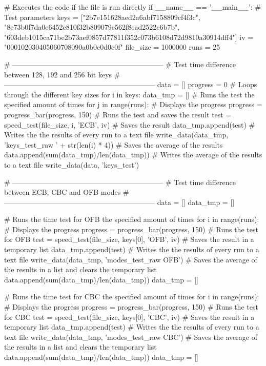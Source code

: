 \begin{python}
# Executes the code if the file is run directly
if __name__ == '__main__':
    # Test parameters
    keys = ["2b7e151628aed2a6abf7158809cf4f3c",
            "8e73b0f7da0e6452c810f32b809079e562f8ead2522c6b7b",
    "603deb1015ca71be2b73aef0857d77811f352c073b6108d72d9810a30914dff4"]
    iv = "000102030405060708090a0b0c0d0e0f"
    file_size = 1000000
    runs = 25

    # ---------------------------------------------------------------
    #     Test time difference between 128, 192 and 256 bit keys
    # ---------------------------------------------------------------
    data = []
    progress = 0
    # Loops through the different key sizes
    for i in keys:
        data_tmp = []
        # Runs the test the specified amount of times
        for j in range(runs):
            # Displays the progress
            progress = progress_bar(progress, 150)
            # Runs the test and saves the result
            test = speed_test(file_size, i, 'ECB', iv)
            # Saves the result
            data_tmp.append(test)
        # Writes the the results of every run to a text file
        write_data(data_tmp, 'keys_test_raw ' + str(len(i) * 4))
        # Saves the average of the results
        data.append(sum(data_tmp)/len(data_tmp))
    # Writes the average of the results to a text file
    write_data(data, 'keys_test')

    # ---------------------------------------------------------------
    #      Test time difference between ECB, CBC and OFB modes
    # ---------------------------------------------------------------
    data = []
    data_tmp = []

    # Runs the time test for OFB the specified amount of times
    for i in range(runs):
        # Displays the progress
        progress = progress_bar(progress, 150)
        # Runs the test for OFB
        test = speed_test(file_size, keys[0], 'OFB', iv)
        # Saves the result in a temporary list
        data_tmp.append(test)
    # Writes the the results of every run to a text file
    write_data(data_tmp, 'modes_test_raw OFB')
    # Saves the average of the results in a list and clears the temporary list
    data.append(sum(data_tmp)/len(data_tmp))
    data_tmp = []

    # Runs the time test for CBC the specified amount of times
    for i in range(runs):
        # Displays the progress
        progress = progress_bar(progress, 150)
        # Runs the test for CBC
        test = speed_test(file_size, keys[0], 'CBC', iv)
        # Saves the result in a temporary list
        data_tmp.append(test)
    # Writes the the results of every run to a text file
    write_data(data_tmp, 'modes_test_raw CBC')
    # Saves the average of the results in a list and clears the temporary list
    data.append(sum(data_tmp)/len(data_tmp))
    data_tmp = []


\end{python}
